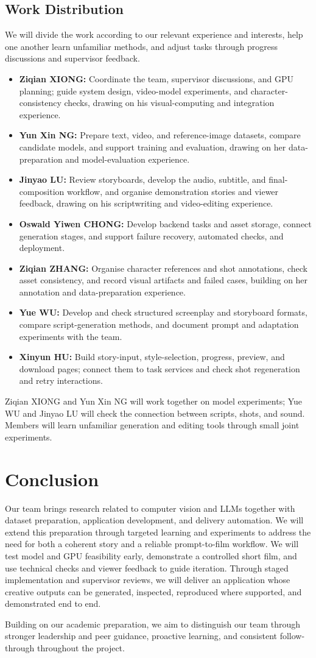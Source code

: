 \documentclass[a4paper,12pt]{article}
\begin{document}
\subsection{Work Distribution}
We will divide the work according to our relevant experience and interests, help one another learn unfamiliar methods, and adjust tasks through progress discussions and supervisor feedback.
\begin{itemize}
  \item \textbf{Ziqian XIONG:} Coordinate the team, supervisor discussions, and GPU planning; guide system design, video-model experiments, and character-consistency checks, drawing on his visual-computing and integration experience.
  \item \textbf{Yun Xin NG:} Prepare text, video, and reference-image datasets, compare candidate models, and support training and evaluation, drawing on her data-preparation and model-evaluation experience.
  \item \textbf{Jinyao LU:} Review storyboards, develop the audio, subtitle, and final-composition workflow, and organise demonstration stories and viewer feedback, drawing on his scriptwriting and video-editing experience.
  \item \textbf{Oswald Yiwen CHONG:} Develop backend tasks and asset storage, connect generation stages, and support failure recovery, automated checks, and deployment.
  \item \textbf{Ziqian ZHANG:} Organise character references and shot annotations, check asset consistency, and record visual artifacts and failed cases, building on her annotation and data-preparation experience.
  \item \textbf{Yue WU:} Develop and check structured screenplay and storyboard formats, compare script-generation methods, and document prompt and adaptation experiments with the team.
  \item \textbf{Xinyun HU:} Build story-input, style-selection, progress, preview, and download pages; connect them to task services and check shot regeneration and retry interactions.
\end{itemize}

Ziqian XIONG and Yun Xin NG will work together on model experiments; Yue WU and Jinyao LU will check the connection between scripts, shots, and sound. Members will learn unfamiliar generation and editing tools through small joint experiments.

\clearpage
\section{Conclusion}
Our team brings research related to computer vision and LLMs together with dataset preparation, application development, and delivery automation. We will extend this preparation through targeted learning and experiments to address the need for both a coherent story and a reliable prompt-to-film workflow. We will test model and GPU feasibility early, demonstrate a controlled short film, and use technical checks and viewer feedback to guide iteration. Through staged implementation and supervisor reviews, we will deliver an application whose creative outputs can be generated, inspected, reproduced where supported, and demonstrated end to end.

Building on our academic preparation, we aim to distinguish our team through stronger leadership and peer guidance, proactive learning, and consistent follow-through throughout the project.
\end{document}

